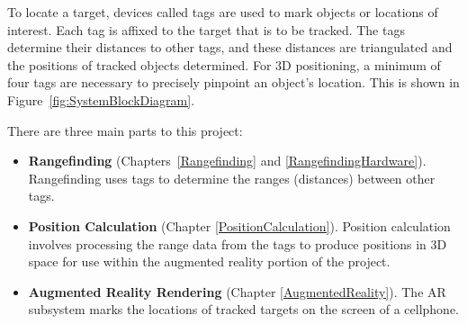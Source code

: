 To locate a target, devices called tags are used to mark objects or locations of interest. Each tag is affixed to the target that is to be tracked. The tags determine their distances to other tags, and these distances are triangulated and the positions of tracked objects determined. For 3D positioning, a minimum of four tags are necessary to precisely pinpoint an object's location. This is shown in Figure~\ref{fig:SystemBlockDiagram}.

There are three main parts to this project: 
\begin{itemize}
	\item \textbf{Rangefinding} (Chapters~\ref{Rangefinding} and \ref{RangefindingHardware}). Rangefinding uses tags to determine the ranges (distances) between other tags.
	\item \textbf{Position Calculation} (Chapter \ref{PositionCalculation}). Position calculation involves processing the range data from the tags to produce positions in 3D space for use within the augmented reality portion of the project.
	\item \textbf{Augmented Reality Rendering} (Chapter \ref{AugmentedReality}). The AR subsystem marks the locations of tracked targets on the screen of a cellphone.
\end{itemize}

